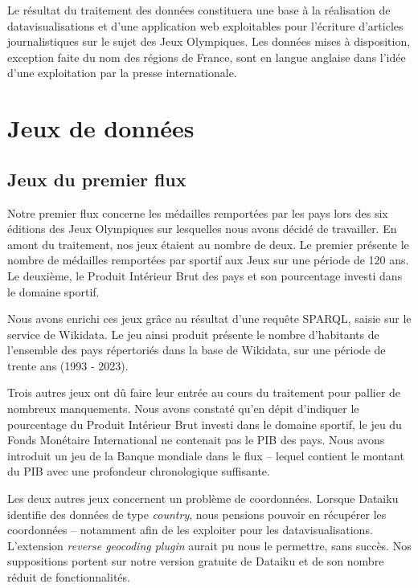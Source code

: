 \documentclass[hidelinks, 12pt]{report}
\begin{document}
Le résultat du traitement des données constituera une base à la réalisation de datavisualisations et d'une application web exploitables pour l'écriture d'articles journalistiques sur le sujet des Jeux Olympiques. Les données mises à disposition, exception faite du nom des régions de France, sont en langue anglaise dans l'idée d'une exploitation par la presse internationale.





%





\chapter{Jeux de données}

\section{Jeux du premier flux}

Notre premier flux concerne les médailles remportées par les pays lors des six éditions des Jeux Olympiques sur lesquelles nous avons décidé de travailler. En amont du traitement, nos jeux étaient au nombre de deux. Le premier présente le nombre de médailles remportées par sportif aux Jeux sur une période de 120 ans\autocite{kaggle}. Le deuxième, le Produit Intérieur Brut des pays et son pourcentage investi dans le domaine sportif\autocite{fmi}.

Nous avons enrichi ces jeux grâce au résultat d'une requête SPARQL, saisie sur le service de Wikidata. Le jeu ainsi produit présente le nombre d'habitants de l'ensemble des pays répertoriés dans la base de Wikidata, sur une période de trente ans (1993 - 2023)\autocite{wikiquerypop}.

Trois autres jeux ont dû faire leur entrée au cours du traitement pour pallier de nombreux manquements. Nous avons constaté qu'en dépit d'indiquer le pourcentage du Produit Intérieur Brut investi dans le domaine sportif, le jeu du Fonds Monétaire International ne contenait pas le PIB des pays. Nous avons introduit un jeu de la Banque mondiale\autocite{worldbank} dans le flux -- lequel contient le montant du PIB avec une profondeur chronologique suffisante.

Les deux autres jeux concernent un problème de coordonnées. Lorsque Dataiku identifie des données de type \textit{country}, nous pensions pouvoir en récupérer les coordonnées -- notamment afin de les exploiter pour les datavisualisations. L'extension \textit{reverse geocoding plugin} aurait pu nous le permettre, sans succès. Nos suppositions portent sur notre version gratuite de Dataiku et de son nombre réduit de fonctionnalités.
\end{document}
